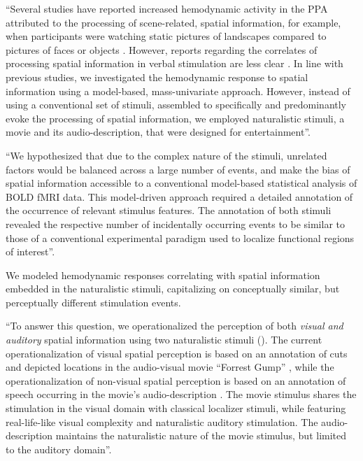 ``Several studies have reported increased hemodynamic activity in the PPA
attributed to the processing of scene-related, spatial information, for example,
when participants were watching static pictures of landscapes compared to
pictures of faces or objects \citep{epstein1998ppa, epstein1999parahippocampal}.
However, reports regarding the correlates of processing spatial information in
verbal stimulation are less clear \citep{aziz2008modulation}.
In line with previous studies, we investigated the hemodynamic response to
spatial information using a model-based, mass-univariate approach.
However, instead of using a conventional set of stimuli, assembled to
specifically and predominantly evoke the processing of spatial information, we
employed naturalistic stimuli, a movie and its audio-description, that were
designed for entertainment''.

``We hypothesized that due to the complex nature of the stimuli, unrelated factors
would be balanced across a large number of events, and make the bias of spatial
information accessible to a conventional model-based statistical analysis of BOLD
fMRI data.
This model-driven approach required a detailed annotation of the occurrence of
relevant stimulus features.
The annotation of both stimuli revealed the respective number of incidentally
occurring events to be similar to those of a conventional experimental paradigm
used to localize functional regions of interest''.

We modeled hemodynamic responses correlating with spatial information embedded
in the naturalistic stimuli, capitalizing on conceptually similar, but
perceptually different stimulation events.


``To answer this question, we operationalized the perception of both
\textit{visual and auditory} spatial information using two naturalistic stimuli
(\citep[see reviews][]{hamilton2018revolution, hasson2008neurocinematics,
sonkusare2019naturalistic}).
The current operationalization of visual spatial perception is based on an
annotation of cuts and depicted locations in the audio-visual movie ``Forrest
Gump'' \citep{haeusler2016cutanno}, while
the operationalization of non-visual spatial perception is based on an
annotation of speech occurring in the movie's audio-description
\citep{haeusler2021studyforrest}.
The movie stimulus shares the stimulation in the visual domain with classical
localizer stimuli, while featuring real-life-like visual complexity and
naturalistic auditory stimulation. The audio-description maintains the
naturalistic nature of the movie stimulus, but limited to the auditory domain''.

